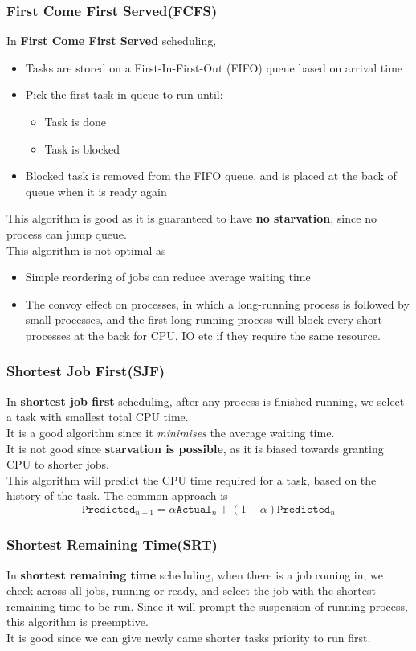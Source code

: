 \documentclass[12pt]{article}
\theoremstyle{definition}
\begin{document}
\subsubsection{First Come First Served(FCFS)}
In \textbf{First Come First Served} scheduling, 
\begin{itemize}
  \item Tasks are stored on a First-In-First-Out (FIFO) queue based on arrival time
  \item Pick the first task in queue to run until:
  \begin{itemize}
    \item Task is done
    \item Task is blocked
  \end{itemize}
  \item Blocked task is removed from the FIFO queue, and is placed at the back of queue when it is ready again
\end{itemize}
This algorithm is good as it is guaranteed to have \textbf{no starvation}, since no process can jump queue.\\
This algorithm is not optimal as 
\begin{itemize}
  \item Simple reordering of jobs can reduce average waiting time
  \item The convoy effect on processes, in which a long-running process is followed by small processes, and the first long-running process will block every short processes at the back for CPU, IO etc if they require the same resource.
\end{itemize}
\subsubsection{Shortest Job First(SJF)}
In \textbf{shortest job first} scheduling, after any process is finished running, we select a task with smallest total CPU time.\\
It is a good algorithm since it \textit{minimises} the average waiting time. \\
It is not good since \textbf{starvation is possible}, as it is biased towards granting CPU to shorter jobs.\\
This algorithm will predict the CPU time required for a task, based on the history of the task. The common approach is
\[
\texttt{Predicted}_{n+1}=\alpha \texttt{Actual}_n+(1-\alpha)\texttt{Predicted}_n
\]
\subsubsection{Shortest Remaining Time(SRT)}
In \textbf{shortest remaining time} scheduling, when there is a job coming in, we check across all jobs, running or ready, and select the job with the shortest remaining time to be run. Since it will prompt the suspension of running process, this algorithm is preemptive.\\
It is good since we can give newly came shorter tasks priority to run first.
\end{document}
